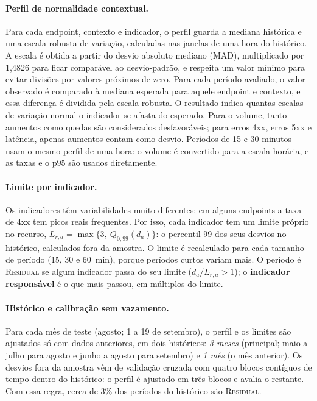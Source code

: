 \documentclass[sigconf,nonacm]{acmart}
\newcommand{\Residual}{\textsc{Residual}\xspace}
\begin{document}
\paragraph{Perfil de normalidade contextual.} Para cada endpoint, contexto e indicador, o perfil guarda a mediana histórica e uma escala robusta de variação, calculadas nas janelas de uma hora do histórico. A escala é obtida a partir do desvio absoluto mediano (MAD), multiplicado por 1,4826 para ficar comparável ao desvio-padrão, e respeita um valor mínimo para evitar divisões por valores próximos de zero. Para cada período avaliado, o valor observado é comparado à mediana esperada para aquele endpoint e contexto, e essa diferença é dividida pela escala robusta. O resultado indica quantas escalas de variação normal o indicador se afasta do esperado. Para o volume, tanto aumentos como quedas são considerados desfavoráveis; para erros 4xx, erros 5xx e latência, apenas aumentos contam como desvio. Períodos de 15 e 30 minutos usam o mesmo perfil de uma hora: o volume é convertido para a escala horária, e as taxas e o p95 são usados diretamente.

\paragraph{Limite por indicador.} Os indicadores têm variabilidades muito diferentes; em alguns endpoints a taxa de 4xx tem picos reais frequentes. Por isso, cada indicador tem um limite próprio no recurso, $L_{r,a}=\max\{3,\ Q_{0{,}99}(d_a)\}$: o percentil 99 dos seus desvios no histórico, calculados fora da amostra. O limite é recalculado para cada tamanho de período (15, 30 e 60~min), porque períodos curtos variam mais. O período é \Residual se algum indicador passa do seu limite ($d_a/L_{r,a}>1$); o \textbf{indicador responsável} é o que mais passou, em múltiplos do limite.

\paragraph{Histórico e calibração sem vazamento.} Para cada mês de teste (agosto; 1 a 19 de setembro), o perfil e os limites são ajustados só com dados anteriores, em dois históricos: \emph{3 meses} (principal; maio a julho para agosto e junho a agosto para setembro) e \emph{1 mês} (o mês anterior). Os desvios fora da amostra vêm de validação cruzada com quatro blocos contíguos de tempo dentro do histórico: o perfil é ajustado em três blocos e avalia o restante. Com essa regra, cerca de 3\% dos períodos do histórico são \Residual.
\end{document}
